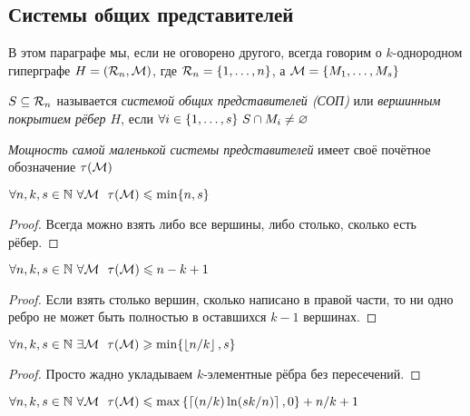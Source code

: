 \subsection{Системы общих представителей}

\begin{note}
	В этом параграфе мы, если не оговорено другого, всегда говорим о $k$-однородном гиперграфе $H = (\mathcal{R}_n, \mathcal{M})$, где $\mathcal{R}_n = \{1, \ldots, n\}$, а $\mathcal{M} = \{M_1, \ldots, M_s\}$
\end{note}

\begin{definition}
	$S \subseteq \mathcal{R}_n$ называется \textit{системой общих представителей (СОП)} или \textit{вершинным покрытием рёбер $H$}, если $\forall i \in \{1, \ldots, s\}\ S \cap M_i \neq \varnothing$
\end{definition}

\begin{definition}
	\textit{Мощность самой маленькой системы представителей} имеет своё почётное обозначение $\tau(\mathcal{M})$
\end{definition}

\begin{proposition}
	$\forall n, k, s \in \N\ \forall \cM\ \ \tau(\cM) \le \min\{n, s\}$
\end{proposition}

\begin{proof}
	Всегда можно взять либо все вершины, либо столько, сколько есть рёбер.
\end{proof}

\begin{proposition}
	$\forall n, k, s \in \N\ \forall \cM\ \ \tau(\cM) \le n - k + 1$
\end{proposition}

\begin{proof}
	Если взять столько вершин, сколько написано в правой части, то ни одно ребро не может быть полностью в оставшихся $k - 1$ вершинах.
\end{proof}

\begin{proposition}
	$\forall n, k, s \in \N\ \exists \cM\ \ \tau(\cM) \ge \min\{\floor{n / k}, s\}$
\end{proposition}

\begin{proof}
	Просто жадно укладываем $k$-элементные рёбра без пересечений.
\end{proof}

\begin{theorem}
	$\forall n, k, s \in \N\ \forall \cM\ \ \tau(\cM) \le \max\set{\ceil{(n / k)\ln(sk / n)}, 0} + n / k + 1$
\end{theorem}

